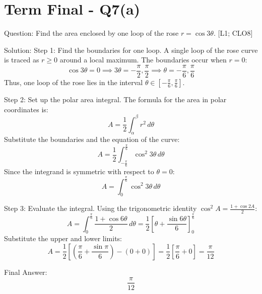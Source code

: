 \documentclass[11pt, a4paper]{article}
\begin{document}


\section*{Term Final - Q7(a)}

Question:
Find the area enclosed by one loop of the rose $r = \cos 3\theta$. [L1; CLO8]

Solution:
Step 1: Find the boundaries for one loop.
A single loop of the rose curve is traced as $r \ge 0$ around a local maximum.
The boundaries occur when $r = 0$:
\[
\cos 3\theta = 0 \implies 3\theta = -\frac{\pi}{2}, \frac{\pi}{2} \implies \theta = -\frac{\pi}{6}, \frac{\pi}{6}
\]
Thus, one loop of the rose lies in the interval $\theta \in [-\frac{\pi}{6}, \frac{\pi}{6}]$.

Step 2: Set up the polar area integral.
The formula for the area in polar coordinates is:
\[
A = \frac{1}{2} \int_{\alpha}^{\beta} r^2 \, d\theta
\]
Substitute the boundaries and the equation of the curve:
\[
A = \frac{1}{2} \int_{-\frac{\pi}{6}}^{\frac{\pi}{6}} \cos^2 3\theta \, d\theta
\]
Since the integrand is symmetric with respect to $\theta = 0$:
\[
A = \int_{0}^{\frac{\pi}{6}} \cos^2 3\theta \, d\theta
\]

Step 3: Evaluate the integral.
Using the trigonometric identity $\cos^2 A = \frac{1 + \cos 2A}{2}$:
\[
A = \int_{0}^{\frac{\pi}{6}} \frac{1 + \cos 6\theta}{2} \, d\theta = \frac{1}{2} \left[ \theta + \frac{\sin 6\theta}{6} \right]_{0}^{\frac{\pi}{6}}
\]
Substitute the upper and lower limits:
\[
A = \frac{1}{2} \left[ \left(\frac{\pi}{6} + \frac{\sin \pi}{6}\right) - (0 + 0) \right] = \frac{1}{2} \left[ \frac{\pi}{6} + 0 \right] = \frac{\pi}{12}
\]

Final Answer:
\[
\boxed{\frac{\pi}{12}}
\]


\end{document}
